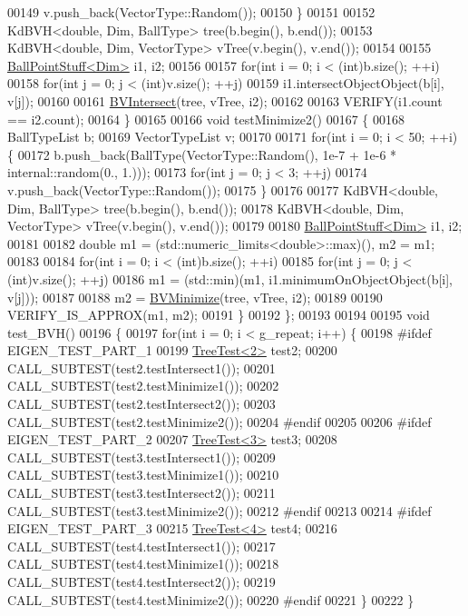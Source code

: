 \begin{DoxyCode}
00149             v.push\_back(VectorType::Random());
00150     \}
00151 
00152     KdBVH<double, Dim, BallType> tree(b.begin(), b.end());
00153     KdBVH<double, Dim, VectorType> vTree(v.begin(), v.end());
00154 
00155     \hyperlink{struct_ball_point_stuff}{BallPointStuff<Dim>} i1, i2;
00156 
00157     \textcolor{keywordflow}{for}(\textcolor{keywordtype}{int} i = 0; i < (int)b.size(); ++i)
00158         \textcolor{keywordflow}{for}(\textcolor{keywordtype}{int} j = 0; j < (int)v.size(); ++j)
00159             i1.intersectObjectObject(b[i], v[j]);
00160 
00161     \hyperlink{namespace_eigen_a07d8e283f082c972338f3fc4f644b2a9}{BVIntersect}(tree, vTree, i2);
00162 
00163     VERIFY(i1.count == i2.count);
00164   \}
00165 
00166   \textcolor{keywordtype}{void} testMinimize2()
00167   \{
00168     BallTypeList b;
00169     VectorTypeList v;
00170 
00171     \textcolor{keywordflow}{for}(\textcolor{keywordtype}{int} i = 0; i < 50; ++i) \{
00172         b.push\_back(BallType(VectorType::Random(), 1e-7 + 1e-6 * internal::random(0., 1.)));
00173         \textcolor{keywordflow}{for}(\textcolor{keywordtype}{int} j = 0; j < 3; ++j)
00174             v.push\_back(VectorType::Random());
00175     \}
00176 
00177     KdBVH<double, Dim, BallType> tree(b.begin(), b.end());
00178     KdBVH<double, Dim, VectorType> vTree(v.begin(), v.end());
00179 
00180     \hyperlink{struct_ball_point_stuff}{BallPointStuff<Dim>} i1, i2;
00181 
00182     \textcolor{keywordtype}{double} m1 = (std::numeric\_limits<double>::max)(), m2 = m1;
00183 
00184     \textcolor{keywordflow}{for}(\textcolor{keywordtype}{int} i = 0; i < (int)b.size(); ++i)
00185         \textcolor{keywordflow}{for}(\textcolor{keywordtype}{int} j = 0; j < (int)v.size(); ++j)
00186             m1 = (std::min)(m1, i1.minimumOnObjectObject(b[i], v[j]));
00187 
00188     m2 = \hyperlink{namespace_eigen_adcbe73ac1482eacab0e18ee32c25508e}{BVMinimize}(tree, vTree, i2);
00189 
00190     VERIFY\_IS\_APPROX(m1, m2);
00191   \}
00192 \};
00193 
00194 
00195 \textcolor{keywordtype}{void} test\_BVH()
00196 \{
00197   \textcolor{keywordflow}{for}(\textcolor{keywordtype}{int} i = 0; i < g\_repeat; i++) \{
00198 \textcolor{preprocessor}{#ifdef EIGEN\_TEST\_PART\_1}
00199     \hyperlink{struct_tree_test}{TreeTest<2>} test2;
00200     CALL\_SUBTEST(test2.testIntersect1());
00201     CALL\_SUBTEST(test2.testMinimize1());
00202     CALL\_SUBTEST(test2.testIntersect2());
00203     CALL\_SUBTEST(test2.testMinimize2());
00204 \textcolor{preprocessor}{#endif}
00205 
00206 \textcolor{preprocessor}{#ifdef EIGEN\_TEST\_PART\_2}
00207     \hyperlink{struct_tree_test}{TreeTest<3>} test3;
00208     CALL\_SUBTEST(test3.testIntersect1());
00209     CALL\_SUBTEST(test3.testMinimize1());
00210     CALL\_SUBTEST(test3.testIntersect2());
00211     CALL\_SUBTEST(test3.testMinimize2());
00212 \textcolor{preprocessor}{#endif}
00213 
00214 \textcolor{preprocessor}{#ifdef EIGEN\_TEST\_PART\_3}
00215     \hyperlink{struct_tree_test}{TreeTest<4>} test4;
00216     CALL\_SUBTEST(test4.testIntersect1());
00217     CALL\_SUBTEST(test4.testMinimize1());
00218     CALL\_SUBTEST(test4.testIntersect2());
00219     CALL\_SUBTEST(test4.testMinimize2());
00220 \textcolor{preprocessor}{#endif}
00221   \}
00222 \}
\end{DoxyCode}
